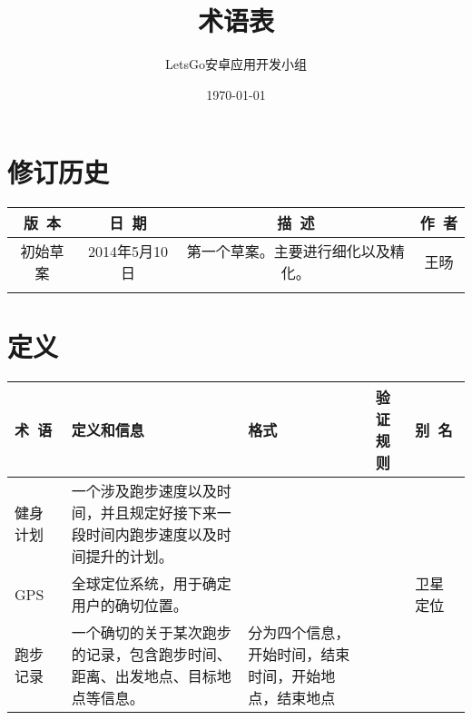 \documentclass [a4paper,11pt]{article}
\title{术语表}
\date{\today}
\author{LetsGo安卓应用开发小组}
\begin{document}
	
\maketitle
\section*{修订历史}

\begin{table}[!hbp]
\centering

\begin{tabular*}{\textwidth}{c|c|c|c}
\hline
\rule{0pt}{0.8cm}
版~本 & 日~期 & 描~述 & 作~者\\
\hline
\rule{0pt}{0.6cm}
初始草案 & 2014年5月10日 & 第一个草案。主要进行细化以及精化。 & 王旸\\
\hline
\rule{0pt}{0.6cm}
 &  &  & \\
\hline
\end{tabular*}
\end{table}


\section*{定义}	

\begin{table}[!hbp]
\centering
\begin{tabular*}{\textwidth}{p{}|p{}|p{}|p{}|p{}}

\hline
\rule{0pt}{0.8cm}
术~语 & 定义和信息 & 格式 & 验证规则 & 别~名\\

\hline
\rule{0pt}{0.6cm}
健身计划 & 一个涉及跑步速度以及时间，并且规定好接下来一段时间内跑步速度以及时间提升的计划。 &&&\\

\hline
\rule{0pt}{0.6cm}
GPS & 全球定位系统，用于确定用户的确切位置。 &&& 卫星定位\\

\hline
\rule{0pt}{0.6cm}
跑步记录 & 一个确切的关于某次跑步的记录，包含跑步时间、距离、出发地点、目标地点等信息。 & 分为四个信息，开始时间，结束时间，开始地点，结束地点 &&\\
 
\hline
\end{tabular*}
\end{table}

  
\end{document}
